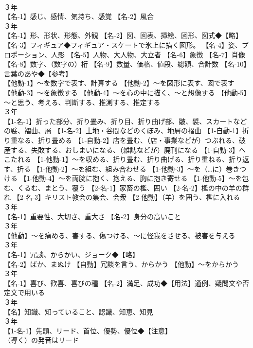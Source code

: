 \documentclass[8pt]{extreport}
\begin{document}
\begin{CJK}{UTF8}{min}
\\	３年	
\\	【名-1】感じ、感情、気持ち、感覚 【名-2】風合
\\	３年	
\\	【名-1】形、形状、形態、外観 【名-2】図、図表、挿絵、図形、図式◆【略】
\\	【名-3】フィギュア◆フィギュア・スケートで氷上に描く図形。 【名-4】姿、プロポーション、人影 【名-5】人物、大人物、大立者 【名-6】象徴 【名-7】肖像 【名-8】数字、（数字の）桁 【名-9】数量、価格、値段、総額、合計数 【名-10】言葉のあや◆【参考】
\\	【他動-1】～を数字で表す、計算する 【他動-2】～を図形に表す、図で表す 【他動-3】～を象徴する 【他動-4】～を心の中に描く、～と想像する 【他動-5】～と思う、考える、判断する、推測する、推定する
\\	３年	
\\	【1-名-1】折った部分、折り畳み、折り目、折り曲げ部、皺、襞、スカートなどの襞、褶曲、層 【1-名-2】土地・谷間などのくぼみ、地層の褶曲 【1-自動-1】折り重なる、折り畳める 【1-自動-2】店を畳む、（店・事業などが）つぶれる、破産する、失敗する、おしまいになる、（雑誌などが）廃刊になる 【1-自動-3】へこたれる 【1-他動-1】～を収める、折り畳む、折り曲げる、折り重ねる、折り返す、折る 【1-他動-2】～を組む、組み合わせる 【1-他動-3】～を（…に）巻きつける 【1-他動-4】～を両腕に抱く、抱える、胸に抱き寄せる 【1-他動-5】～を包む、くるむ、まとう、覆う 【2-名-1】家畜の檻、囲い 【2-名-2】檻の中の羊の群れ 【2-名-3】キリスト教会の集会、会衆 【2-他動】（羊）を囲う、檻に入れる
\\	３年	
\\	【名-1】重要性、大切さ、重大さ 【名-2】身分の高いこと
\\	３年	
\\	【他動】～を痛める、害する、傷つける、～に怪我をさせる、被害を与える
\\	３年	
\\	【名-1】冗談、からかい、ジョーク◆【略】
\\	【名-2】ばか、まぬけ 【自動】冗談を言う、からかう 【他動】～をからかう
\\	３年	
\\	【名-1】喜び、歓喜、喜びの種 【名-2】満足、成功◆【用法】通例、疑問文や否定文で用いる
\\	３年	
\\	【名】知識、知っていること、認識、知恵、知見
\\	３年	
\\	【1-名-1】先頭、リード、首位、優勢、優位◆【注意】
\\	（導く）の発音はリード

\end{CJK}
\end{document}
